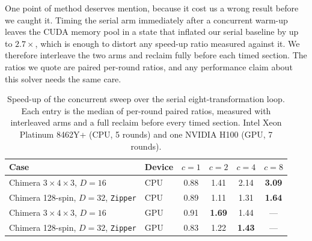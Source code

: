\documentclass[preprint,12pt,a4paper]{elsarticle}
\begin{document}
One point of method deserves mention, because it cost us a wrong result before we
caught it. Timing the serial arm immediately after a concurrent warm-up leaves the
CUDA memory pool in a state that inflated our serial baseline by up to $2.7\times$,
which is enough to distort any speed-up ratio measured against it. We therefore
interleave the two arms and reclaim fully before each timed section. The ratios we
quote are paired per-round ratios, and any performance claim about this solver needs
the same care.

\begin{table}[t]
\small
\centering
\caption{Speed-up of the concurrent sweep over the serial eight-transformation loop.
Each entry is the median of per-round paired ratios, measured with interleaved arms
and a full reclaim before every timed section. Intel Xeon Platinum 8462Y+ (CPU, 5
rounds) and one NVIDIA H100 (GPU, 7 rounds).}
\label{tab:sweep}
\begin{tabular}{@{}llcccc@{}}
\toprule
Case & Device & $c{=}1$ & $c{=}2$ & $c{=}4$ & $c{=}8$ \\
\midrule
Chimera $3\!\times\!4\!\times\!3$, $D{=}16$ & CPU & 0.88 & 1.41 & 2.14 & \textbf{3.09} \\
Chimera 128-spin, $D{=}32$, \texttt{Zipper} & CPU & 0.89 & 1.11 & 1.31 & \textbf{1.64} \\
Chimera $3\!\times\!4\!\times\!3$, $D{=}16$ & GPU & 0.91 & \textbf{1.69} & 1.44 & --- \\
Chimera 128-spin, $D{=}32$, \texttt{Zipper} & GPU & 0.83 & 1.22 & \textbf{1.43} & --- \\
\bottomrule
\end{tabular}
\end{table}
\end{document}
